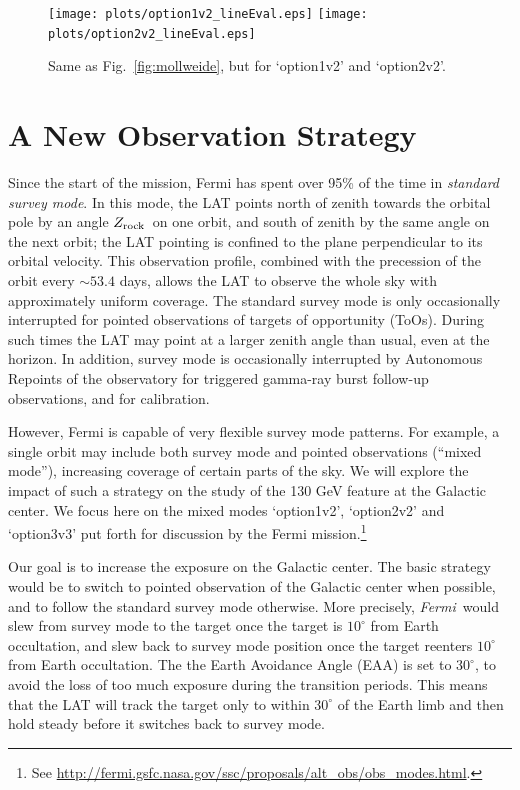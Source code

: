 \documentclass[aps,prd,superscriptaddress,nofootinbib,fixlfloat, 12pt]{revtex4-1}
\newcommand{\Fermi}{{\slshape Fermi}}
\newcommand{\zrock}{$Z_{\rm rock}$}
\begin{document}
\begin{figure}[t]
  \begin{center}
    \texttt{[image: plots/option1v2\_lineEval.eps]}
    \texttt{[image: plots/option2v2\_lineEval.eps]}
    \vspace{-0.5cm}
  \end{center}
  \caption{Same as Fig.~\ref{fig:mollweide}, but for `option1v2' and
  `option2v2'.}
  \label{fig:mollweide2}
\end{figure}

\section{A New Observation Strategy}
Since the start of the mission, Fermi has spent over 95\% of the time in
\emph{standard survey mode}.
In this mode, the LAT points north of zenith towards the orbital pole by an
angle \zrock\ on one orbit, and south of zenith by the same angle on the next
orbit; the LAT pointing is confined to the plane perpendicular to its orbital
velocity. 
This observation profile, combined with the precession of the orbit every
$\sim53.4$ days, allows the LAT to observe the whole sky with approximately
uniform coverage. The standard survey mode is only occasionally interrupted
for pointed observations of targets of opportunity (ToOs). During such times
the LAT may point at a larger zenith angle than usual, even at the horizon.  In
addition, survey mode is occasionally interrupted by Autonomous Repoints of
the observatory for triggered gamma-ray burst follow-up observations, and for
calibration.

However, Fermi is capable of very flexible survey mode patterns. For example,
a single orbit may include both survey mode and pointed observations (``mixed
mode''), increasing coverage of certain parts of the sky. We will explore the
impact of such a strategy on the study of the 130 GeV feature at the Galactic
center.  We focus here on the mixed modes `option1v2', `option2v2' and
`option3v3' put forth for discussion by the Fermi mission.\footnote{See
\url{http://fermi.gsfc.nasa.gov/ssc/proposals/alt_obs/obs_modes.html}.}

Our goal is to increase the exposure on the Galactic center.  The
basic strategy would be to switch to pointed observation of the Galactic
center when possible, and to follow the standard survey mode otherwise. More
precisely, \Fermi\ would slew from survey mode to the target once the target
is $10^\circ$ from Earth occultation, and slew back to survey mode position
once the target reenters $10^\circ$ from Earth occultation.  The
the Earth Avoidance Angle (EAA) is set to
$30^\circ$, to avoid the loss of too much exposure during the transition
periods. This means that the LAT will track the target only to within $30^\circ$ of
the Earth limb and then hold steady before it switches back to survey mode. 
\end{document}
